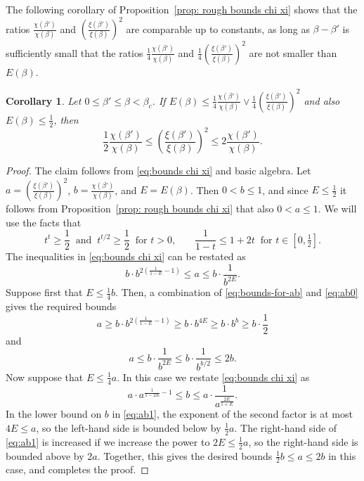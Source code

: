 \documentclass[11pt,a4paper]{article}
\numberwithin{equation}{section}
\theoremstyle{plain}
\newtheorem{Coro}[Thm]{Corollary}
\theoremstyle{definition}
\newcommand\1{\mathds{1}}
\begin{document}
The following corollary of Proposition~\ref{prop: rough bounds chi xi}
shows that the ratios $\frac{\chi(\beta')}{\chi(\beta)}$ and $(\frac{\xi(\beta')}{\xi(\beta)})^2$ are comparable up to constants,
as long as $\beta-\beta'$ is sufficiently small that the
ratios $\frac 14 \frac{\chi(\beta')}{\chi(\beta)}$ and
$\frac 14 (\frac{\xi(\beta')}{\xi(\beta)})^2$ are not smaller than $E(\beta)$.
\begin{Coro}
\label{cor: comparison chi xi when E small}	
Let $0\leq \beta'\leq \beta< \beta_c$.
If $E(\beta)\leq \frac{1}{4}\frac{\chi(\beta')}{\chi(\beta)} \vee \frac{1}{4}(\frac{\xi(\beta')}{\xi(\beta)})^2$ and also $E(\beta)\leq \tfrac{1}{2}$, then
\begin{equation}
\label{eq: comparison chi xi when E small}
	\frac{1}{2}\frac{\chi(\beta')}{\chi(\beta)}
    \leq
    \left(\frac{\xi(\beta')}{\xi(\beta)}\right)^2\leq 2\frac{\chi(\beta')}{\chi(\beta)}.
\end{equation}
\end{Coro}

\begin{proof}
The claim follows from \eqref{eq:bounds chi xi} and basic algebra.
Let $a=(\frac{\xi(\beta')}{\xi(\beta)})^2$, $b=\frac{\chi(\beta')}{\chi(\beta)}$,
and $E=E(\beta)$.  Then $0 < b \leq 1$, and since $E\leq \tfrac{1}{2}$
it follows from Proposition~\ref{prop: rough bounds chi xi} that also $0<a\leq 1$.  We will use the facts that
\begin{equation}
\label{eq:bounds-for-ab}
    t^t \ge \frac 12 \;\;\text{and}\;\; t^{t/2} \ge \frac 12 \;\;\text{for $t >0$,}
    \qquad
    \frac{1}{1-t} \le 1 +2t \;\;\text{for $t \in [0, \tfrac 12]$.}
\end{equation}
The inequalities in \eqref{eq:bounds chi xi} can be restated as
\begin{equation}\label{eq:ab0}
    b\cdot b^{2(\frac{1}{1-E}-1)} \le a \le b\cdot \frac{1}{b^{2E}}.
\end{equation}
Suppose first that $E \le \frac 14 b$.  Then, a combination of \eqref{eq:bounds-for-ab} and \eqref{eq:ab0} gives
the required bounds
\begin{equation}
 a \ge b \cdot b^{2(\tfrac{1}{1-E}-1)} \ge
b\cdot b^{4E}\ge b \cdot b^b \ge
    b\cdot \frac 12
\end{equation}
 and
   \begin{equation}
   	a\leq b\cdot \frac{1}{b^{2E}}\leq b\cdot \frac{1}{b^{b/2}}\leq 2b.
   \end{equation}
Now suppose that $E \le \frac 14 a$.  In this case we restate \eqref{eq:bounds chi xi} as
\begin{equation}
\label{eq:ab1}
    a\cdot a^{\frac{1}{1-2E}-1} \le b \le a\cdot \frac{1}{a^{\frac{2E}{1+E}}}.
\end{equation}
In the lower bound on $b$ in
\eqref{eq:ab1},
the exponent of the second factor is at most $4E \le a$, so the left-hand side
is bounded below by $\frac 12 a$.  The right-hand side of \eqref{eq:ab1} is
increased if we increase the power to $2E \le \frac 12 a$, so the right-hand side
is bounded above by $2a$.  Together, this gives the desired bounds $\frac 12 b \le a \le 2b$ in
this case, and completes the proof.
\end{proof}
\end{document}
